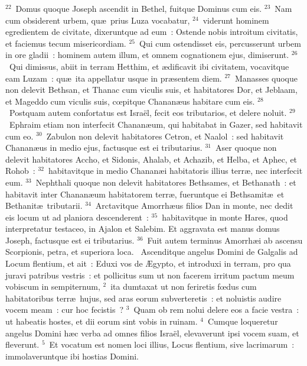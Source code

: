 ${}^{22}$~Domus quoque Joseph ascendit in Bethel, fuitque Dominus cum eis.
${}^{23}$~Nam cum obsiderent urbem, qu\ae\ prius Luza vocabatur,
${}^{24}$~viderunt hominem egredientem de civitate, dixeruntque ad eum~: Ostende nobis introitum civitatis, et faciemus tecum misericordiam.
${}^{25}$~Qui cum ostendisset eis, percusserunt urbem in ore gladii~: hominem autem illum, et omnem cognationem ejus, dimiserunt.
${}^{26}$~Qui dimissus, abiit in terram Hetthim, et \ae dificavit ibi civitatem, vocavitque eam Luzam~: qu\ae\ ita appellatur usque in pr\ae sentem diem.
${}^{27}$~Manasses quoque non delevit Bethsan, et Thanac cum viculis suis, et habitatores Dor, et Jeblaam, et Mageddo cum viculis suis, cœpitque Chanan\ae us habitare cum eis.
${}^{28}$~Postquam autem confortatus est Isra\"el, fecit eos tributarios, et delere noluit.
${}^{29}$~Ephraim etiam non interfecit Chanan\ae um, qui habitabat in Gazer, sed habitavit cum eo.
${}^{30}$~Zabulon non delevit habitatores Cetron, et Naalol~: sed habitavit Chanan\ae us in medio ejus, factusque est ei tributarius.
${}^{31}$~Aser quoque non delevit habitatores Accho, et Sidonis, Ahalab, et Achazib, et Helba, et Aphec, et Rohob~:
${}^{32}$~habitavitque in medio Chanan\ae i habitatoris illius terr\ae , nec interfecit eum.
${}^{33}$~Nephthali quoque non delevit habitatores Bethsames, et Bethanath~: et habitavit inter Chanan\ae um habitatorem terr\ae , fueruntque ei Bethsamit\ae\ et Bethanit\ae\ tributarii.
${}^{34}$~Arctavitque Amorrh\ae us filios Dan in monte, nec dedit eis locum ut ad planiora descenderent~:
${}^{35}$~habitavitque in monte Hares, quod interpretatur testaceo, in Ajalon et Salebim. Et aggravata est manus domus Joseph, factusque est ei tributarius.
${}^{36}$~Fuit autem terminus Amorrh\ae i ab ascensu Scorpionis, petra, et superiora loca.
~Ascenditque angelus Domini de Galgalis ad Locum flentium, et ait~: Eduxi vos de \AE gypto, et introduxi in terram, pro qua juravi patribus vestris~: et pollicitus sum ut non facerem irritum pactum meum vobiscum in sempiternum,
${}^{2}$~ita dumtaxat ut non feriretis fœdus cum habitatoribus terr\ae\ hujus, sed aras eorum subverteretis~: et noluistis audire vocem meam~: cur hoc fecistis~?
${}^{3}$~Quam ob rem nolui delere eos a facie vestra~: ut habeatis hostes, et dii eorum sint vobis in ruinam.
${}^{4}$~Cumque loqueretur angelus Domini h\ae c verba ad omnes filios Isra\"el, elevaverunt ipsi vocem suam, et fleverunt.
${}^{5}$~Et vocatum est nomen loci illius, Locus flentium, sive lacrimarum~: immolaveruntque ibi hostias Domini.


